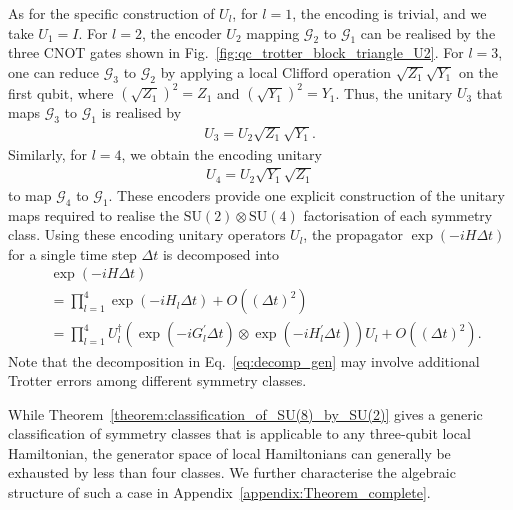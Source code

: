\documentclass[aps,showpacs,amsmath,amssymb,twocolumn,prx,longbibliography,superscriptaddress,notitlepage,floatfix,10pt]{revtex4-2}
\begin{document}
As for the specific construction of $U_{l}$, for $l=1$, the encoding is trivial, and we take $U_{1}=I$.
For $l=2$, the encoder $U_{2}$ mapping $\mathcal{G}_{2}$ to $\mathcal{G}_{1}$ can be realised by the three CNOT gates shown in Fig.~\ref{fig:qc_trotter_block_triangle_U2}.
For $l=3$, one can reduce $\mathcal{G}_{3}$ to $\mathcal{G}_{2}$ by applying a local Clifford operation $\sqrt{Z_{1}}\sqrt{Y_{1}}$ on the first qubit, where $(\sqrt{Z_{1}})^{2} = Z_{1}$ and $(\sqrt{Y_{1}})^{2} = Y_{1}$.
Thus, the unitary $U_{3}$ that maps $\mathcal{G}_{3}$ to $\mathcal{G}_{1}$ is realised by
\begin{equation}
\begin{split}
    U_{3}=U_{2}\sqrt{Z_{1}}\sqrt{Y_{1}}.
\end{split}
\end{equation}
Similarly, for $l=4$, we obtain the encoding unitary
\begin{equation}
\begin{split}
    U_{4}=U_{2}\sqrt{Y_{1}}\sqrt{Z_{1}}
\end{split}
\end{equation}
to map $\mathcal{G}_{4}$ to $\mathcal{G}_{1}$.
These encoders provide one explicit construction of the unitary maps required to realise the $\mathrm{SU}(2)\otimes\mathrm{SU}(4)$ factorisation of each symmetry class.
Using these encoding unitary operators $U_{l}$, the propagator $\exp(-iH\Delta t)$ for a single time step $\Delta t$ is decomposed into
\begin{equation}\label{eq:decomp_gen}
\begin{split}
    & \exp(-iH\Delta t) \\
    &= \prod_{l=1}^{4}
       \exp\left(-iH_{l}\Delta t\right)
       + O((\Delta t)^{2}) \\
    &= \prod_{l=1}^{4}
       U_{l}^{\dagger}
       \left(\exp\left(-iG_{l}^{\prime}\Delta t\right)\otimes\exp\left(-iH_{l}^{\prime}\Delta t\right)\right)
       U_{l} + O((\Delta t)^{2}).
\end{split}
\end{equation}
Note that the decomposition in Eq.~\eqref{eq:decomp_gen} may involve additional Trotter errors among different symmetry classes.

While Theorem~\ref{theorem:classification_of_SU(8)_by_SU(2)} gives a generic classification of symmetry classes that is applicable to any three-qubit local Hamiltonian, the generator space of local Hamiltonians can generally be exhausted by less than four classes.
We further characterise the algebraic structure of such a case in Appendix~\ref{appendix:Theorem_complete}.
\end{document}
